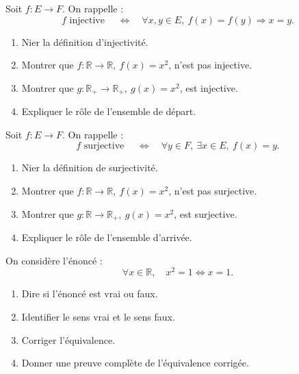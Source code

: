 \documentclass[11pt,a4paper]{article}
\newcommand{\R}{\mathbb{R}}
\newcommand{\imp}{\Rightarrow}
\begin{document}
\begin{exercicebox}
Soit \(f:E\to F\). On rappelle :
\[
f \text{ injective }\quad\Longleftrightarrow\quad
\forall x,y\in E,\ f(x)=f(y)\imp x=y.
\]

\begin{enumerate}[label=\alph*)]
    \item Nier la définition d'injectivité.
    \item Montrer que \(f:\R\to\R,\ f(x)=x^2\), n'est pas injective.
    \item Montrer que \(g:\R_+\to\R_+,\ g(x)=x^2\), est injective.
    \item Expliquer le rôle de l'ensemble de départ.
\end{enumerate}
\end{exercicebox}

\begin{exercicebox}
Soit \(f:E\to F\). On rappelle :
\[
f \text{ surjective }\quad\Longleftrightarrow\quad
\forall y\in F,\ \exists x\in E,\ f(x)=y.
\]

\begin{enumerate}[label=\alph*)]
    \item Nier la définition de surjectivité.
    \item Montrer que \(f:\R\to\R,\ f(x)=x^2\), n'est pas surjective.
    \item Montrer que \(g:\R\to\R_+,\ g(x)=x^2\), est surjective.
    \item Expliquer le rôle de l'ensemble d'arrivée.
\end{enumerate}
\end{exercicebox}

\begin{exercicebox}
On considère l'énoncé :
\[
\forall x\in\R,\quad x^2=1 \Longleftrightarrow x=1.
\]

\begin{enumerate}[label=\alph*)]
    \item Dire si l'énoncé est vrai ou faux.
    \item Identifier le sens vrai et le sens faux.
    \item Corriger l'équivalence.
    \item Donner une preuve complète de l'équivalence corrigée.
\end{enumerate}
\end{exercicebox}
\end{document}
